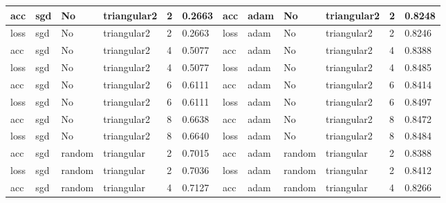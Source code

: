 \begin{table}[H]
\begin{adjustbox}{width=1\textwidth}
\begin{tabular}{|l|l|l|l|l|l||l|l|l|l|l|l|}
acc           & sgd          & No          & triangular2     & 2             & 0.2663            & acc           & adam         & No          & triangular2     & 2             & 0.8248            \\ \hline
loss          & sgd          & No          & triangular2     & 2             & 0.2663            & loss          & adam         & No          & triangular2     & 2             & 0.8246            \\ \hline
acc           & sgd          & No          & triangular2     & 4             & 0.5077            & acc           & adam         & No          & triangular2     & 4             & 0.8388            \\ \hline
loss          & sgd          & No          & triangular2     & 4             & 0.5077            & loss          & adam         & No          & triangular2     & 4             & 0.8485            \\ \hline
acc           & sgd          & No          & triangular2     & 6             & 0.6111            & acc           & adam         & No          & triangular2     & 6             & 0.8414            \\ \hline
loss          & sgd          & No          & triangular2     & 6             & 0.6111            & loss          & adam         & No          & triangular2     & 6             & 0.8497            \\ \hline
acc           & sgd          & No          & triangular2     & 8             & 0.6638            & acc           & adam         & No          & triangular2     & 8             & 0.8472            \\ \hline
loss          & sgd          & No          & triangular2     & 8             & 0.6640            & loss          & adam         & No          & triangular2     & 8             & 0.8484            \\ \hline
acc           & sgd          & random        & triangular      & 2             & 0.7015            & acc           & adam         & random        & triangular      & 2             & 0.8388            \\ \hline
loss          & sgd          & random        & triangular      & 2             & 0.7036            & loss          & adam         & random        & triangular      & 2             & 0.8412            \\ \hline
acc           & sgd          & random        & triangular      & 4             & 0.7127            & acc           & adam         & random        & triangular      & 4             & 0.8266            \\ \hline

\end{tabular}
\end{adjustbox}
\end{table}

